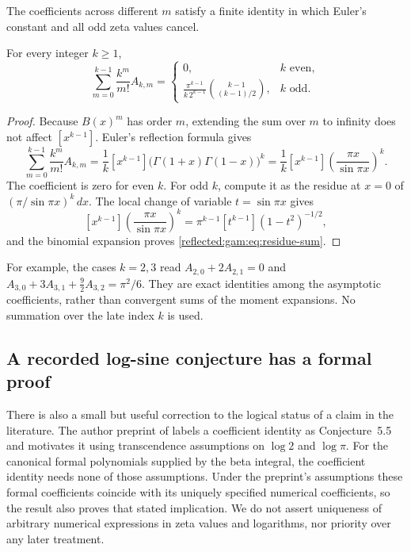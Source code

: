 The coefficients across different $m$ satisfy a finite identity in which
Euler's constant and all odd zeta values cancel.

\begin{proposition}\label{reflected:gam:prop:residue-sum}
For every integer $k\ge1$,
\begin{equation}\label{reflected:gam:eq:residue-sum}
 \sum_{m=0}^{k-1}\frac{k^m}{m!}A_{k,m}
 =\begin{cases}
 0,&k\text{ even},\\[2pt]
 \displaystyle\frac{\pi^{k-1}}{k\,2^{k-1}}
 \binom{k-1}{(k-1)/2},&k\text{ odd}.
 \end{cases}
\end{equation}
\end{proposition}
\begin{proof}
Because $B(x)^m$ has order $m$, extending the sum over $m$ to infinity
does not affect $[x^{k-1}]$.  Euler's reflection formula gives
\[
 \sum_{m=0}^{k-1}\frac{k^m}{m!}A_{k,m}
 =\frac1k[x^{k-1}]\bigl(\Gamma(1+x)\Gamma(1-x)\bigr)^k
 =\frac1k[x^{k-1}]\left(\frac{\pi x}{\sin\pi x}\right)^k.
\]
The coefficient is zero for even $k$.  For odd $k$, compute it as
the residue at $x=0$ of $(\pi/\sin\pi x)^k\,dx$.
The local change of variable $t=\sin\pi x$ gives
\[
 [x^{k-1}]\left(\frac{\pi x}{\sin\pi x}\right)^k
 =\pi^{k-1}[t^{k-1}](1-t^2)^{-1/2},
\]
and the binomial expansion proves \eqref{reflected:gam:eq:residue-sum}.
\end{proof}

For example, the cases $k=2,3$ read
$A_{2,0}+2A_{2,1}=0$ and
$A_{3,0}+3A_{3,1}+\tfrac92 A_{3,2}=\pi^2/6$.
They are exact identities among the asymptotic coefficients, rather
than convergent sums of the moment expansions.  No summation over
the late index $k$ is used.

\subsection{A recorded log-sine conjecture has a formal proof}

There is also a small but useful correction to the logical status of
a claim in the literature.  The author preprint of \cite{gaussian:ACEMKM}
labels a coefficient identity as Conjecture~5.5 and motivates it using
transcendence assumptions on $\log 2$ and $\log\pi$.
For the canonical formal polynomials supplied by the beta integral,
the coefficient identity needs none of those assumptions.  Under the
preprint's assumptions these formal coefficients coincide with its
uniquely specified numerical coefficients, so the result also proves
that stated implication.  We do not assert uniqueness of arbitrary
numerical expressions in zeta values and logarithms, nor priority over
any later treatment.

